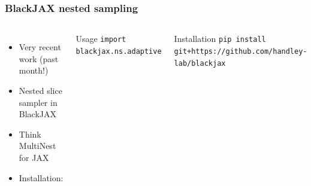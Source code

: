 \documentclass[aspectratio=169]{beamer}
\begin{document}
\begin{frame}
    \frametitle{BlackJAX nested sampling}
    \begin{columns}
        \begin{itemize}
            \item Very recent work (past month!)
            \item Nested slice sampler in BlackJAX
            \item Think MultiNest for JAX
            \item Installation:
        \end{itemize}
        \begin{block}{Usage}
            \texttt{import blackjax.ns.adaptive}
        \end{block}
        \begin{block}{Installation}
            \texttt{pip install git+https://github.com/handley-lab/blackjax}
        \end{block}
        \includegraphics[width=\textwidth]{people/david_yallup.jpg}
    \end{columns}
\end{frame}
\end{document}
